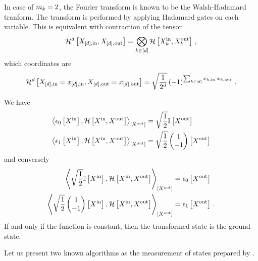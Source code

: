 In case of $m_{k}=2$, the Fourier transform is known to be the Walsh-Hadamard tranform.
The transform is performed by applying Hadamard gates on each variable.
This is equivalent with contraction of the tensor
\begin{align*}
    \mathcal{H}^{d}\left[X_{[d],\mathrm{in}},X_{[d],\mathrm{out}}\right] =
    \bigotimes_{k\in[d]} \mathcal{H}\left[X_{k}^{\mathrm{in}},X_{k}^{\mathrm{out}}\right] \, ,
\end{align*}
which coordinates are
\begin{align*}
    \mathcal{H}^{d}\left[X_{[d],\mathrm{in}}=x_{[d],\mathrm{in}},X_{[d],\mathrm{out}}=x_{[d],\mathrm{out}}\right] =
    \sqrt{\frac{1}{2^{d}}} \left(-1\right)^{\sum_{k\in[d]}x_{k,\mathrm{in}} \cdot x_{k,\mathrm{out}}} \, .
\end{align*}

We have
\begin{align*}
    \left\langle \epsilon_{0}\left[X^{\mathrm{in}}\right],
        \mathcal{H}\left[X^{\mathrm{in}},X^{\mathrm{out}}\right]\right\rangle_{\left[ X^{\mathrm{out}} \right]}
    &= \sqrt{\frac{1}{2}} \mathbb{I}\left[X^{\mathrm{out}}\right] \\
    \left\langle \epsilon_{1}\left[X^{\mathrm{in}}\right],
        \mathcal{H}\left[X^{\mathrm{in}},X^{\mathrm{out}}\right]\right\rangle_{\left[ X^{\mathrm{out}} \right]}
    &= \sqrt{\frac{1}{2}} \begin{pmatrix} 1 \\ -1 \end{pmatrix}\left[X^{\mathrm{out}}\right]
\end{align*}
and conversely
\begin{align*}
    \left\langle \sqrt{\frac{1}{2}} \mathbb{I}\left[X^{\mathrm{in}}\right],
        \mathcal{H}\left[X^{\mathrm{in}},X^{\mathrm{out}}\right]\right\rangle_{\left[ X^{\mathrm{out}} \right]}
    &= \epsilon_{0}\left[X^{\mathrm{out}}\right] \\
    \left\langle \sqrt{\frac{1}{2}} \begin{pmatrix} 1 \\ -1 \end{pmatrix}\left[X^{\mathrm{in}}\right],
        \mathcal{H}\left[X^{\mathrm{in}},X^{\mathrm{out}}\right]\right\rangle_{\left[ X^{\mathrm{out}} \right]}
    &= \epsilon_{1}\left[X^{\mathrm{out}}\right] \, .
\end{align*}
If and only if the function is constant, then the transformed state is the ground state.

Let us present two known algorithms as the measurement of states prepared by \computationCircuits{}.

